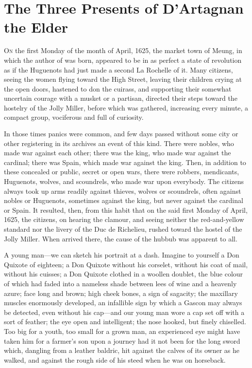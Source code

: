 
\chapter{The Three Presents of D'Artagnan the Elder}

\lettrine{O}{n} the first Monday of the month of April, 1625, the market town of Meung, in which the author of  was born, appeared to be in as perfect a state of revolution as if the Huguenots had just made a second La Rochelle of it. Many citizens, seeing the women flying toward the High Street, leaving their children crying at the open doors, hastened to don the cuirass, and supporting their somewhat uncertain courage with a musket or a partisan, directed their steps toward the hostelry of the Jolly Miller, before which was gathered, increasing every minute, a compact group, vociferous and full of curiosity. 

In those times panics were common, and few days passed without some city or other registering in its archives an event of this kind. There were nobles, who made war against each other; there was the king, who made war against the cardinal; there was Spain, which made war against the king. Then, in addition to these concealed or public, secret or open wars, there were robbers, mendicants, Huguenots, wolves, and scoundrels, who made war upon everybody. The citizens always took up arms readily against thieves, wolves or scoundrels, often against nobles or Huguenots, sometimes against the king, but never against the cardinal or Spain. It resulted, then, from this habit that on the said first Monday of April, 1625, the citizens, on hearing the clamour, and seeing neither the red-and-yellow standard nor the livery of the Duc de Richelieu, rushed toward the hostel of the Jolly Miller. When arrived there, the cause of the hubbub was apparent to all. 

A young man—we can sketch his portrait at a dash. Imagine to yourself a Don Quixote of eighteen; a Don Quixote without his corselet, without his coat of mail, without his cuisses; a Don Quixote clothed in a woollen doublet, the blue colour of which had faded into a nameless shade between lees of wine and a heavenly azure; face long and brown; high cheek bones, a sign of sagacity; the maxillary muscles enormously developed, an infallible sign by which a Gascon may always be detected, even without his cap—and our young man wore a cap set off with a sort of feather; the eye open and intelligent; the nose hooked, but finely chiselled. Too big for a youth, too small for a grown man, an experienced eye might have taken him for a farmer's son upon a journey had it not been for the long sword which, dangling from a leather baldric, hit against the calves of its owner as he walked, and against the rough side of his steed when he was on horseback. 

